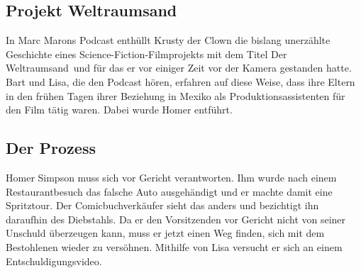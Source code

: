 
\subsection{Projekt Weltraumsand}\label{YABF06}
In Marc Marons Podcast enthüllt Krusty der Clown die bislang unerzählte Geschichte eines Science-Fiction-Filmprojekts mit dem Titel \glqq Der Weltraumsand\grqq\ und für das er vor einiger Zeit vor der Kamera gestanden hatte. Bart und Lisa, die den Podcast hören, erfahren auf diese Weise, dass ihre Eltern in den frühen Tagen ihrer Beziehung in Mexiko als Produktionsassistenten für den Film tätig waren. Dabei wurde Homer entführt.


\subsection{Der Prozess}\label{YABF07}
Homer Simpson muss sich vor Gericht verantworten. Ihm wurde nach einem Restaurantbesuch das falsche Auto ausgehändigt und er machte damit eine Spritztour. Der Comicbuchverkäufer sieht das anders und bezichtigt ihn daraufhin des Diebstahls. Da er den Vorsitzenden vor Gericht nicht von seiner Unschuld überzeugen kann, muss er jetzt einen Weg finden, sich mit dem Bestohlenen wieder zu versöhnen. Mithilfe von Lisa versucht er sich an einem Entschuldigungsvideo.

